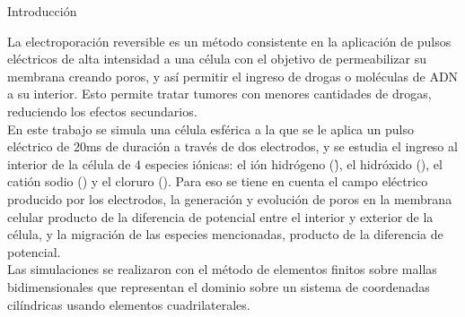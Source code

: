 \documentclass[a0,portrait]{a0poster}
\begin{document}
\vspace{1cm} %


\begin{multicols}{2} %

\color{Navy} %

\begin{center}Introducción\end{center}
La electroporación reversible es un método consistente en la aplicación de pulsos eléctricos de alta intensidad a una célula con el objetivo de permeabilizar su membrana creando poros, y así permitir el ingreso de drogas o moléculas de ADN a su interior. Esto permite tratar tumores con menores cantidades de drogas, reduciendo los efectos secundarios.\\

En este trabajo se simula una célula esférica a la que se le aplica un pulso eléctrico de 20\si{\milli\second} de duración a través de dos electrodos, y se estudia el ingreso al interior de la célula de 4 especies iónicas: el ión hidrógeno (\h), el hidróxido (\oh), el catión sodio (\na) y el cloruro (\cl). Para eso se tiene en cuenta el campo eléctrico producido por los electrodos, la generación y evolución de poros en la membrana celular producto de la diferencia de potencial entre el interior y exterior de la célula, y la migración de las especies mencionadas, producto de la diferencia de potencial.\\

Las simulaciones se realizaron con el método de elementos finitos sobre mallas bidimensionales que representan el dominio sobre un sistema de coordenadas cilíndricas usando elementos cuadrilaterales.




\end{multicols}
\end{document}
